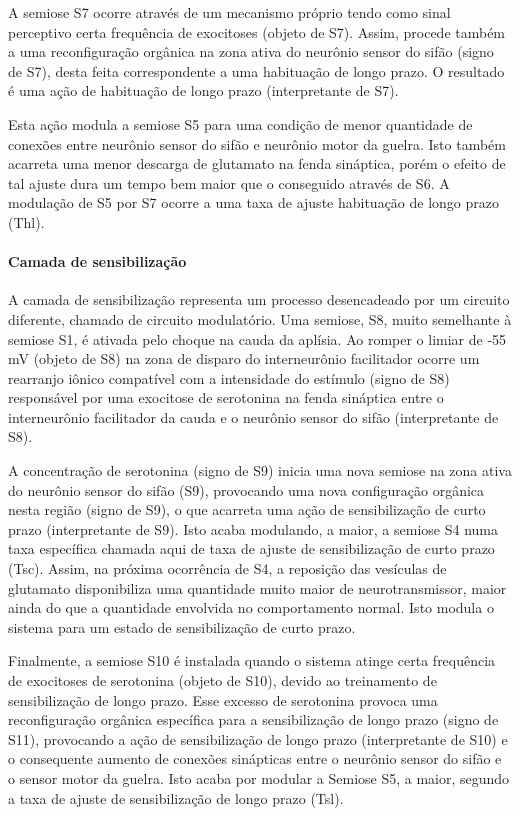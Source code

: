 A semiose S7 ocorre através de um mecanismo próprio tendo como sinal perceptivo certa frequência de exocitoses (objeto de S7). Assim, procede também a uma reconfiguração orgânica na zona ativa do neurônio sensor do sifão (signo de S7), desta feita correspondente a uma habituação de longo prazo. O resultado é uma ação de habituação de longo prazo (interpretante de S7).

Esta ação modula a semiose S5 para uma condição de menor quantidade de conexões entre neurônio sensor do sifão e neurônio motor da guelra. Isto também acarreta uma menor descarga de glutamato na fenda sináptica, porém o efeito de tal ajuste dura um tempo bem maior que o conseguido através de S6. A modulação de S5 por S7 ocorre a uma taxa de ajuste habituação de longo prazo (Thl).

\paragraph*{Camada de sensibilização}

A camada de sensibilização representa um processo desencadeado por um circuito diferente, chamado de circuito modulatório. Uma semiose, S8, muito semelhante à semiose S1, é ativada pelo choque na cauda da aplísia. Ao romper o limiar de -55 mV (objeto de S8) na zona de disparo do interneurônio facilitador ocorre um rearranjo iônico compatível com a intensidade do estímulo (signo de S8) responsável por uma exocitose de serotonina na fenda sináptica entre o interneurônio facilitador da cauda e o neurônio sensor do sifão (interpretante de S8).

A concentração de serotonina (signo de S9) inicia uma nova semiose na zona ativa do neurônio sensor do sifão (S9), provocando uma nova configuração orgânica nesta região (signo de S9), o que acarreta uma ação de sensibilização de curto prazo (interpretante de S9). Isto acaba modulando, a maior, a semiose S4 numa taxa específica chamada aqui de taxa de ajuste de sensibilização de curto prazo (Tsc). Assim, na próxima ocorrência de S4, a reposição das vesículas de glutamato disponibiliza uma quantidade muito maior de neurotransmissor, maior ainda do que a quantidade envolvida no comportamento normal. Isto modula o sistema para um estado de sensibilização de curto prazo.

Finalmente, a semiose S10 é instalada quando o sistema atinge certa frequência de exocitoses de serotonina (objeto de S10), devido ao treinamento de sensibilização de longo prazo. Esse excesso de serotonina provoca uma reconfiguração orgânica específica para a sensibilização de longo prazo (signo de S11), provocando a ação de sensibilização de longo prazo (interpretante de S10) e o consequente aumento de conexões sinápticas entre o neurônio sensor do sifão e o sensor motor da guelra. Isto acaba por modular a Semiose S5, a maior, segundo a taxa de ajuste de sensibilização de longo prazo (Tsl).

